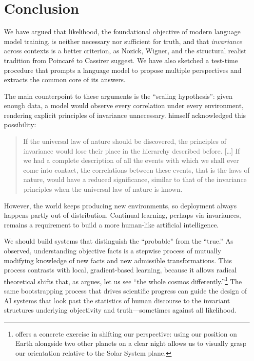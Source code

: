 \section{Conclusion}

We have argued that likelihood, the foundational objective of modern language model training, is neither necessary nor sufficient for truth, and that \emph{invariance} across contexts is a better criterion, as Nozick, Wigner, and the structural realist tradition from Poincar\'{e} to Cassirer suggest. We have also sketched a test-time procedure that prompts a language model to propose multiple perspectives and extracts the common core of its answers.

The main counterpoint to these arguments is the ``scaling hypothesis'': given enough data, a model would observe every correlation under every environment, rendering explicit principles of invariance unnecessary. \citet{wigner1967} himself acknowledged this possibility:
\begin{quote}
If the universal law of nature should be discovered, the principles of invariance would lose their place in the hierarchy described before. [\ldots] If we had a complete description of all the events with which we shall ever come into contact, the correlations between these events, that is the laws of nature, would have a reduced significance, similar to that of the invariance principles when the universal law of nature is known. \citep[pp. 30--31]{wigner1967}
\end{quote}
However, the world keeps producing new environments, so deployment always happens partly out of distribution. Continual learning, perhaps via invariances, remains a requirement to build a more human-like artificial intelligence.

We should build systems that distinguish the ``probable'' from the ``true.'' As \citet[pp.~79--84]{nozick2001} observed, understanding objective facts is a stepwise process of mutually modifying knowledge of new facts and new admissible transformations. This process contrasts with local, gradient-based learning, because it allows radical theoretical shifts that, as \citet{gaukroger2012} argues, let us see ``the whole cosmos differently.''\footnote{\citet{churchland1979} offers a concrete exercise in shifting our perspective: using our position on Earth alongside two other planets on a clear night allows us to visually grasp our orientation relative to the Solar System plane.} The same bootstrapping process that drives scientific progress can guide the design of AI systems that look past the statistics of human discourse to the invariant structures underlying objectivity and truth---sometimes against all likelihood.

